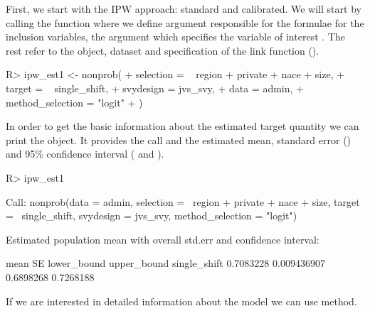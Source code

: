 \documentclass[
]{jss}
\begin{document}
First, we start with the IPW approach: standard and calibrated. We will
start by calling the  function where we define
 argument responsible for the formulae for the inclusion
variables, the  argument which specifies the variable of
interest . The rest refer to the 
object, dataset and specification of the link function
().

\begin{CodeChunk}
\begin{CodeInput}
R> ipw_est1 <- nonprob(
+   selection = ~ region + private + nace + size,
+   target = ~ single_shift,
+   svydesign = jvs_svy,
+   data = admin,
+   method_selection = "logit"
+ )
\end{CodeInput}
\end{CodeChunk}

In order to get the basic information about the estimated target
quantity we can print the object. It provides the call and the estimated
mean, standard error () and 95\% confidence interval
( and ).

\begin{CodeChunk}
\begin{CodeInput}
R> ipw_est1
\end{CodeInput}
\begin{CodeOutput}

Call:
nonprob(data = admin, selection = ~region + private + nace + 
    size, target = ~single_shift, svydesign = jvs_svy, method_selection = "logit")

Estimated population mean with overall std.err and confidence interval:

                  mean          SE lower_bound upper_bound
single_shift 0.7083228 0.009436907   0.6898268   0.7268188
\end{CodeOutput}
\end{CodeChunk}

If we are interested in detailed information about the model we can use
 method.
\end{document}
